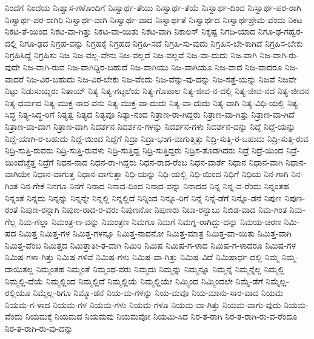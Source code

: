 {ನಿಂದೆಗೆ
ನಿಂದೆಯ
ನಿಃಶ್ವಾಸ-ಗಳೊಂದಿಗೆ
ನಿಃಸ್ವಾರ್ಥ-ತೆಯು
ನಿಃಸ್ವಾರ್ಥ-ತೆಯೆ
ನಿಃಸ್ವಾರ್ಥ-ದಿಂದ
ನಿಃಸ್ವಾರ್ಥ-ಪರ-ರಾಗಿ
ನಿಃಸ್ವಾರ್ಥ-ಪರ-ರಾಗಿರಿ
ನಿಃಸ್ವಾರ್ಥ-ವಾಗಿ
ನಿಃಸ್ವಾರ್ಥ-ವಾದ
ನಿಃಸ್ವಾರ್ಥತೆ
ನಿಃಸ್ವಾರ್ಥದ
ನಿಃಸ್ವಾರ್ಥಪ್ರೇಮ-ವೆಂದು
ನಿಕಟ
ನಿಕಟ-ತೆ-ಯಿಂದ
ನಿಕಟ-ವಾ-ಗಿತ್ತು
ನಿಕಟ-ವಾ-ಯಿತು
ನಿಕಟ-ವಾಗಿ
ನಿಕಾಲಸ್
ನಿಕೃಷ್ಟ
ನಿಗದಿ-ಯಾದ
ನಿಗೂ-ಢ-ಗಹ್ವರ-ದಲ್ಲಿ
ನಿಗೂ-ಢದ
ನಿಗ್ರಹ-ವನ್ನು
ನಿಗ್ರಹಕ್ಕೆ
ನಿಗ್ರಹದ
ನಿಗ್ರಹಿ-ಸದೆ
ನಿಗ್ರಹಿ-ಸು-ವುದು
ನಿಗ್ರಹಿಸ-ಬೇ-ಕಾಗಿದೆ
ನಿಗ್ರಹಿಸ-ಬೇಕು
ನಿಗ್ರಹಿಸಿದ್ದೆ
ನಿಗ್ರಹಿಸು
ನಿಜ
ನಿಜ-ವಲ್ಲ-ವೇನು
ನಿಜ-ವಲ್ಲದೆ
ನಿಜ-ವಲ್ಲವೆ
ನಿಜ-ವಾ-ದುದು
ನಿಜ-ವಾಗಿ
ನಿಜ-ವಾಗಿ-ರು-ವುದೇ
ನಿಜ-ವಾಗಿ-ರುವ
ನಿಜ-ವಾಗಿದ್ದಿರ-ಬಹುದೆ
ನಿಜ-ವಾಗಿಯು
ನಿಜ-ವಾಗಿಯೂ
ನಿಜ-ವಾದ
ನಿಜ-ವಾದರೂ
ನಿಜ-ವಾದರೆ
ನಿಜ-ವಿರ-ಬಹುದು
ನಿಜ-ವಿರ-ಬೇಕು
ನಿಜ-ವೆಂದು
ನಿಜ-ವೆನ್ನು-ವು-ದನ್ನು
ನಿಜ-ಸತ್ತೆ-ಯನ್ನು
ನಿಜವೆ
ನಿಜವೇ
ನಿಟ್ಟು
ನಿಡುಸುಯ್ದರು
ನಿತಾಯ್
ನಿತ್ಯ
ನಿತ್ಯ-ಗಟ್ಟಲೆಯ
ನಿತ್ಯ-ಗೊಪಾಲ
ನಿತ್ಯ-ಜೀವ-ನ-ದಲ್ಲಿ
ನಿತ್ಯ-ಜೀವ-ನದ
ನಿತ್ಯ-ಜೀವನ
ನಿತ್ಯ-ಧರ್ಮದ
ನಿತ್ಯ-ಮುಕ್ತ-ನಾದ-ವನು
ನಿತ್ಯ-ಮುಕ್ತ-ವಾ-ದುದು
ನಿತ್ಯ-ವಾ-ದುದು
ನಿತ್ಯ-ವಾಗಿ
ನಿತ್ಯ-ವಿಧಿ-ಯಲ್ಲಿ
ನಿತ್ಯ-ಸಿದ್ಧ
ನಿತ್ಯ-ಸಿದ್ಧ-ರಿಗೆ
ನಿತ್ಯತ್ವ
ನಿತ್ಯದ
ನಿತ್ಯವೂ
ನಿತ್ಯಾ-ನಂದ
ನಿತ್ರಾಣ-ರಾ-ಗಿದ್ದರು
ನಿತ್ರಾಣ-ವಾ-ಗಿತ್ತು
ನಿತ್ರಾಣ-ವಾ-ಗಿದೆ
ನಿತ್ರಾಣ-ವಾ-ದಾಗ
ನಿತ್ರಾಣ-ವಾಗಿ
ನಿದರ್ಶನ
ನಿದರ್ಶನ-ಗಳನ್ನು
ನಿದರ್ಶನ-ಗಳು
ನಿದರ್ಶನ-ವನ್ನು
ನಿದ್ದೆ
ನಿದ್ದೆ-ಯನ್ನು
ನಿದ್ದೆ-ಯಾಗಿ-ರ-ಬಹುದು
ನಿದ್ದೆ-ಯಿಂದ
ನಿದ್ದೆಗೆ
ನಿದ್ರಾ
ನಿದ್ರಾ-ಭಂಗ-ವಾಗುತ್ತಿತ್ತು
ನಿದ್ರಿ-ಸುತ್ತಿ-ರ-ಬಹುದು
ನಿದ್ರಿ-ಸುತ್ತಿ-ರುವ
ನಿದ್ರಿ-ಸುತ್ತಿ-ರುವರು
ನಿದ್ರಿ-ಸುತ್ತಿ-ರುವಳು
ನಿದ್ರಿ-ಸುತ್ತಿದ್ದ
ನಿದ್ರಿ-ಸುತ್ತಿದ್ದರು
ನಿದ್ರಿಸ-ತೊಡಗಿದರು
ನಿದ್ರೆ
ನಿದ್ರೆ-ಯಿಂದ
ನಿದ್ರೆ-ಯಿಂದೆಚ್ಚೆತ್ತ
ನಿದ್ರೆಗೆ
ನಿಧನ-ನಾದ
ನಿಧನ-ರಾ-ಗಿದ್ದರು
ನಿಧನ-ರಾದ-ರೆಂಬ
ನಿಧನ-ವಾರ್ತೆ
ನಿಧಾನ
ನಿಧಾನ-ವಾಗಿ
ನಿಧಾನ-ವಾಗಿಯೇ
ನಿಧಾನ-ವಾಗುತ್ತ
ನಿಧಾನ-ವಾಗುತ್ತಾ
ನಿಧಿ-ಯನ್ನು
ನಿಧಿ-ಯಲ್ಲಿ
ನಿಧಿ-ಯಿಂದ
ನಿಧಿಗೆ
ನಿಧಿಯ
ನಿನ-ಗಾಗಿ
ನಿನ-ಗಿಂತ
ನಿನ-ಗೇಕೆ
ನಿನಗೂ
ನಿನಗೆ
ನಿನಾದ
ನಿನಾದ-ದಿಂದ
ನಿನಾದ-ವನ್ನು
ನಿನಾದದ
ನಿನ್ನ
ನಿನ್ನ-ವ-ರೆಂದು
ನಿನ್ನಂತಹ
ನಿನ್ನಂತೆ
ನಿನ್ನದು
ನಿನ್ನನ್ನು
ನಿನ್ನನ್ನೇ
ನಿನ್ನಲ್ಲಿ
ನಿನ್ನಲ್ಲಿದೆ
ನಿನ್ನಿಂದ
ನಿನ್ನೂ-ರಿಗೆ
ನಿನ್ನೆ
ನಿನ್ನೆ-ಡೆಗೆ
ನಿನ್ನೊ-ಡನೆ
ನಿಪುಣ
ನಿಪುಣ-ರಂತೆ
ನಿಪುಣ-ರನ್ನಾಗಿ
ನಿಪುಣ-ರಾದ-ರ-ವರು
ನಿಪುಣನೋ
ನಿಪುಣರು
ನಿಬಾ-ರನ್ಬಾಬು
ನಿಬಿಡ-ವಾದ
ನಿಮ-ಗಿಂತ
ನಿಮ-ಗೆಲ್ಲ
ನಿಮ-ಗೆಲ್ಲಾ
ನಿಮಂತ್ರ-ಣ-ವನ್ನು
ನಿಮಂತ್ರಣ
ನಿಮಗೂ
ನಿಮಗೆ
ನಿಮಗ್ನ-ರಾಗಿದ್ದು-ದನ್ನು
ನಿಮಯ-ಚರಣ
ನಿಮಿ-ಷದ
ನಿಮಿತ್ತ
ನಿಮಿತ್ತ-ಗಳ
ನಿಮಿತ್ತ-ಗಳನ್ನೂ
ನಿಮಿತ್ತ-ನಾದನೋ
ನಿಮಿತ್ತ-ಮಾತ್ರ
ನಿಮಿತ್ತ-ವಾ-ಯಿತು
ನಿಮಿತ್ತ-ವಾಗಿ
ನಿಮಿತ್ತ-ವೆಂಬ
ನಿಮಿತ್ತದ
ನಿಮಿತ್ತಾತೀ-ತ-ವಾಗಿ
ನಿಮಿರಿ
ನಿಮಿಷ
ನಿಮಿಷ-ಗ-ಳಾದ
ನಿಮಿಷ-ಗ-ಳಾದರೂ
ನಿಮಿಷ-ಗಳ
ನಿಮಿಷ-ಗಳಾ-ಗಿತ್ತು
ನಿಮಿಷ-ಗಳಿವೆ
ನಿಮಿಷ-ಗಳು
ನಿಮಿಷ-ವಾ-ಗಿತ್ತು
ನಿಮಿಷ-ವಿದೆ
ನಿಮಿಷಾರ್ಧ-ದಲ್ಲಿ
ನಿಮ್ಮ
ನಿಮ್ಮ-ದಾಯಿತಲ್ಲ
ನಿಮ್ಮಂತಹ
ನಿಮ್ಮಂತೆ
ನಿಮ್ಮಂಥ-ವರು
ನಿಮ್ಮದು
ನಿಮ್ಮನ್ನು
ನಿಮ್ಮನ್ನೂ
ನಿಮ್ಮನ್ನೆ
ನಿಮ್ಮನ್ನೆಲ್ಲ
ನಿಮ್ಮಲ್ಲಿ
ನಿಮ್ಮಲ್ಲಿ-ದೆಯೆ
ನಿಮ್ಮಲ್ಲಿಂದ
ನಿಮ್ಮಲ್ಲಿದೆ
ನಿಮ್ಮಲ್ಲಿಯೆ
ನಿಮ್ಮಲ್ಲಿಯೇ
ನಿಮ್ಮಿಂದ
ನಿಮ್ಮಿಂದಲೇ
ನಿಮ್ಮೆ-ಡೆಗೆ
ನಿಮ್ಮೆಲ್ಲ-ರಲ್ಲಿಯೂ
ನಿಮ್ಮೆಲ್ಲ-ರಿಗೂ
ನಿಮ್ಮೊ-ಡನೆ
ನಿಯ-ಮ-ಗಳನ್ನು
ನಿಯ-ಮವೂ
ನಿಯ-ಮಾನು-ಸಾರ-ವಾದ
ನಿಯಮ
ನಿಯಮ-ಗ-ಳಾದ
ನಿಯಮ-ಗಳ
ನಿಯಮ-ಗಳು
ನಿಯಮ-ಗಳೂ
ನಿಯಮ-ವಾ-ಗಿತ್ತು
ನಿಯಮ-ವಾಗು-ವುದು
ನಿಯಮ-ವೆಂದು
ನಿಯಮಕ್ಕೆ
ನಿಯಮದ
ನಿಯಮವು
ನಿಯಮವೋ
ನಿಯಮಿ-ಸಿದ
ನಿರ-ತ-ರಾಗಿ
ನಿರ-ತ-ರಾಗಿ-ರು-ವ-ರೆಂದೂ
ನಿರ-ತ-ರಾಗಿ-ರು-ವು-ದನ್ನು
}
